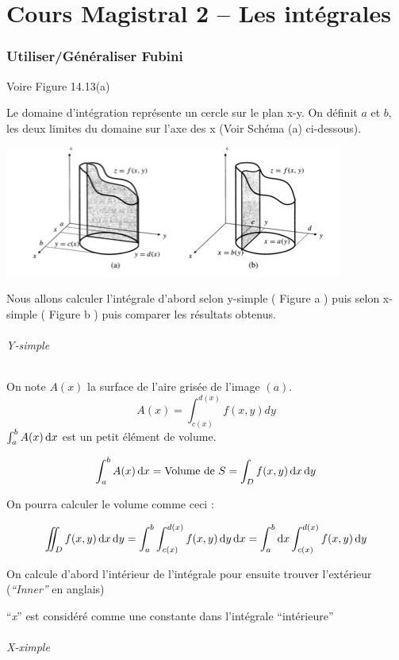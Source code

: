 \part{Cours Magistral 2 -- Les intégrales}
\section{Utiliser/Généraliser Fubini}
Voire Figure 14.13(a)

Le domaine d'intégration représente un cercle sur le plan x-y. On définit $a$ et $b$, les deux limites du domaine sur l'axe des x (Voir Schéma (a) ci-dessous).

\includegraphics[scale=0.8]{image1.png}

Nous allons calculer l'intégrale d'abord selon y-simple ( Figure a ) puis selon x-simple ( Figure b ) puis comparer les résultats obtenus.
\paragraph{Y-simple}
On note $A(x)$ la surface de l'aire grisée de l'image $(a)$.
\[A(x)=\int_{c(x)}^{d(x)}f(x,y)dy\]
$\int_a^b A(x) \operatorname{d}\! x$ est un petit élément de volume.

\[\int_a^b A(x) \operatorname{d}\! x = \text{Volume de }S = \int_Df(x,y) \operatorname{d}\! x \operatorname{d}\! y\]

On pourra calculer le volume comme ceci :

\[ \iint_D f(x,y) \operatorname{d}\! x \operatorname{d}\! y = \int_a^b \int_{c(x)}^{d(x)} f(x,y)  \operatorname{d}\! y \operatorname{d}\! x = \int_a^b \operatorname{d}\! x \int_{c(x)}^{d(x)} f(x,y) \operatorname{d}\! y \]

On calcule d'abord l'intérieur de l'intégrale pour ensuite trouver l'extérieur (\textit{``Inner''} en anglais)
\begin{myrem}
``\emph{x}'' est considéré comme une constante dans l'intégrale ``intérieure''
\end{myrem}

\paragraph{X-ximple}

